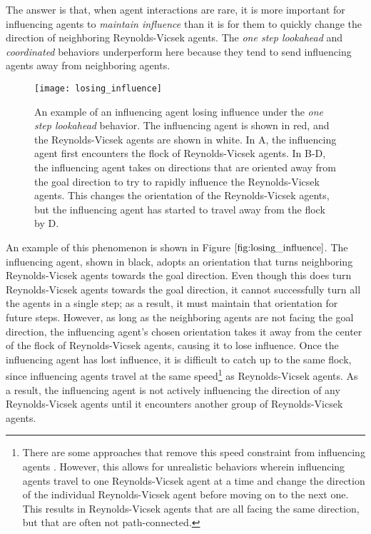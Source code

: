The answer is that, when agent interactions are rare, it is more important for
influencing agents to \textit{maintain influence} than it is for them to quickly
change the direction of neighboring Reynolds-Vicsek agents.
The \textit{one step lookahead} and \textit{coordinated} behaviors underperform
here because they tend to send influencing agents away from neighboring agents.
\begin{figure}
    \texttt{[image: losing\_influence]}
    \caption{An example of an influencing agent losing influence under the
    \textit{one step lookahead} behavior.
    The influencing agent is shown in red, and the Reynolds-Vicsek agents are
    shown in white.
    In A, the influencing agent first encounters the flock of Reynolds-Vicsek
    agents.
    In B-D, the influencing agent takes on directions that are oriented away
    from the goal direction to try to rapidly influence the Reynolds-Vicsek
    agents.
    This changes the orientation of the Reynolds-Vicsek agents, but the
    influencing agent has started to travel away from the flock by D.}
    \label{fig:losing_influence}
\end{figure}
An example of this phenomenon is shown in Figure $\ref{fig:losing_influence}$.
The influencing agent, shown in black, adopts an orientation that turns
neighboring Reynolds-Vicsek agents towards the goal direction.
Even though this does turn Reynolds-Vicsek agents towards the goal direction,
it cannot successfully turn all the agents in a single step; as a result, it
must maintain that orientation for future steps.
However, as long as the neighboring agents are not facing the goal direction,
the influencing agent's chosen orientation takes it away from the center of the
flock of Reynolds-Vicsek agents, causing it to lose influence.
Once the influencing agent has lost influence, it is difficult to catch up to
the same flock, since influencing agents travel at the same speed\footnote{
There are some approaches that remove this speed constraint from
influencing agents \cite{han2010teleporting}.
However, this allows for unrealistic behaviors wherein influencing agents travel
to one Reynolds-Vicsek agent at a time and change the direction of the
individual Reynolds-Vicsek agent before moving on to the next one.
This results in Reynolds-Vicsek agents that are all facing the same direction,
but that are often not path-connected.}
as Reynolds-Vicsek agents.
As a result, the influencing agent is not actively influencing the direction of
any Reynolds-Vicsek agents until it encounters another group of Reynolds-Vicsek
agents.


